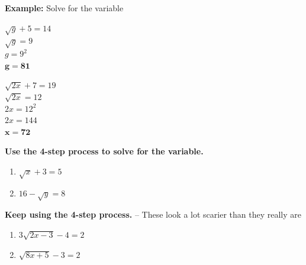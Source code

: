\documentclass[12pt]{article}
\begin{document}
\pagebreak

\textbf{Example:} Solve for the variable\\

\begin{multicols}{2}

$\sqrt{g}+5=14$\\

$\sqrt{g}=9$\\

$g=9^2$\\

$\mathbf{g=81}$\\

\vfill

\columnbreak

$\sqrt{2x}+7=19$\\

$\sqrt{2x}=12$\\

$2x=12^2$\\

$2x=144$\\

$\mathbf{x=72}$\\

\end{multicols}

\textbf{Use the 4-step process to solve for the variable.}\\

\begin{enumerate}

	\item $\sqrt{x}+3=5$\\
	
		\vspace{1in}
	
	\item $16-\sqrt{y}=8$\\
	
		\vspace{1in}
		
\end{enumerate}

\textbf{Keep using the 4-step process.} -- These look a lot scarier than they really are\\

\begin{enumerate}[resume] 
	
	\item $3\sqrt{2x-3}-4=2$\\
	
		\vspace{1in}
		
	\item $\sqrt{8x+5}-3=2$\\
\end{enumerate}
\end{document}
